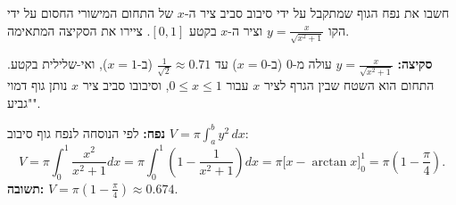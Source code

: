 
\begin{question}
חשבו את נפח הגוף שמתקבל על ידי סיבוב סביב ציר ה-$x$ של התחום המישורי החסום על ידי הקו $y=\frac{x}{\sqrt{x^2+1}}$ וציר ה-$x$ בקטע $[0,1]$. ציירו את הסקיצה המתאימה.
\end{question}

\begin{solution}
\textbf{סקיצה:} $y=\frac{x}{\sqrt{x^2+1}}$ עולה מ-$0$ (ב-$x=0$) עד $\frac1{\sqrt2}\approx0.71$ (ב-$x=1$), ואי-שלילית בקטע. התחום הוא השטח שבין הגרף לציר $x$ עבור $0\le x\le1$, וסיבובו סביב ציר $x$ נותן גוף דמוי "גביע".

\textbf{נפח:} לפי הנוסחה לנפח גוף סיבוב $V=\pi\int_a^by^2\,dx$:
\[
V=\pi\int_0^1\frac{x^2}{x^2+1}dx=\pi\int_0^1\left(1-\frac{1}{x^2+1}\right)dx=\pi\Big[x-\arctan x\Big]_0^1=\pi\left(1-\frac\pi4\right).
\]
\textbf{תשובה:} $V=\pi\left(1-\frac\pi4\right)\approx0.674$.
\end{solution}
